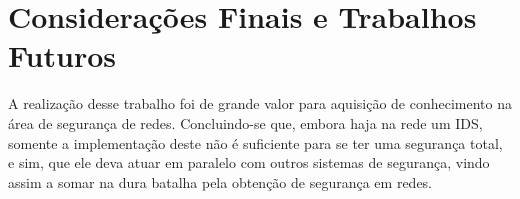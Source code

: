 \chapter{Considerações Finais e Trabalhos Futuros} \label{ch:considerações}

A realização desse trabalho foi de grande valor para aquisição de conhecimento na área de segurança de redes. Concluindo-se que, embora haja na rede um IDS, somente a implementação deste não é suficiente para se ter uma segurança total, e sim, que ele deva atuar em paralelo com outros sistemas de segurança, vindo assim a somar na dura batalha pela obtenção de segurança em redes. 
